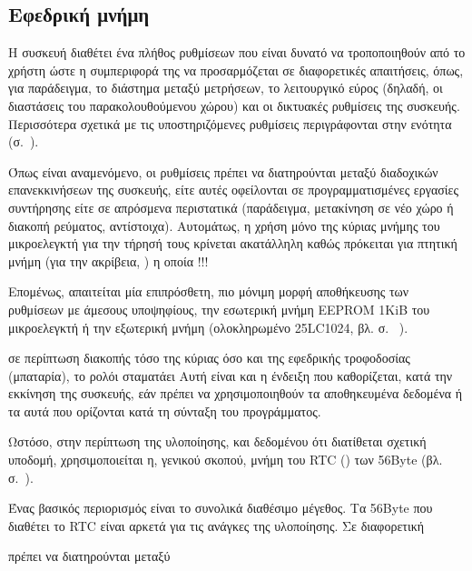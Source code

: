 \subsection{Εφεδρική μνήμη}
\label{subsec:backup-memory}

Η συσκευή διαθέτει ένα πλήθος ρυθμίσεων που είναι δυνατό να τροποποιηθούν από το
χρήστη ώστε η συμπεριφορά της να προσαρμόζεται σε διαφορετικές απαιτήσεις, όπως,
για παράδειγμα, το διάστημα μεταξύ μετρήσεων, το λειτουργικό εύρος (δηλαδή, οι
διαστάσεις του παρακολουθούμενου χώρου) και οι δικτυακές ρυθμίσεις της συσκευής.
Περισσότερα σχετικά με τις υποστηριζόμενες ρυθμίσεις περιγράφονται στην ενότητα
 (σ.~\pageref{subsec:network:config}).


Όπως είναι αναμενόμενο, οι ρυθμίσεις πρέπει να διατηρούνται μεταξύ διαδοχικών
επανεκκινήσεων της συσκευής, είτε αυτές οφείλονται σε προγραμματισμένες
εργασίες συντήρησης είτε σε απρόσμενα περιστατικά (παράδειγμα, μετακίνηση σε
νέο χώρο ή διακοπή ρεύματος, αντίστοιχα). Αυτομάτως, η χρήση μόνο της κύριας
μνήμης του μικροελεγκτή για την τήρησή τους κρίνεται ακατάλληλη καθώς πρόκειται
για πτητική μνήμη (για την ακρίβεια, ) η οποία                   !!!

Επομένως, απαιτείται μία επιπρόσθετη, πιο μόνιμη μορφή αποθήκευσης των
ρυθμίσεων με άμεσους υποψηφίους, την εσωτερική μνήμη EEPROM 1KiB του
μικροελεγκτή ή την εξωτερική μνήμη  (ολοκληρωμένο 25LC1024, βλ. σ.~%
\pageref{subsec:external-memory}).

σε περίπτωση διακοπής τόσο της κύριας όσο και της εφεδρικής τροφοδοσίας
(μπαταρία), το ρολόι σταματάει
Αυτή είναι και η ένδειξη που καθορίζεται, κατά την εκκίνηση της συσκευής, εάν
πρέπει να χρησιμοποιηθούν τα αποθηκευμένα δεδομένα ή τα αυτά που ορίζονται κατά
τη σύνταξη του προγράμματος.

Ωστόσο, στην περίπτωση της υλοποίησης, και δεδομένου ότι διατίθεται σχετική
υποδομή, χρησιμοποιείται η, γενικού σκοπού, μνήμη του RTC ()
των 56Byte (βλ.  σ.~\pageref{subsec:rtc:user-ram}).



Ένας βασικός περιορισμός είναι το συνολικά διαθέσιμο μέγεθος. Τα 56Byte που
διαθέτει το RTC είναι αρκετά για τις ανάγκες της υλοποίησης. Σε διαφορετική

 πρέπει να διατηρούνται μεταξύ 



